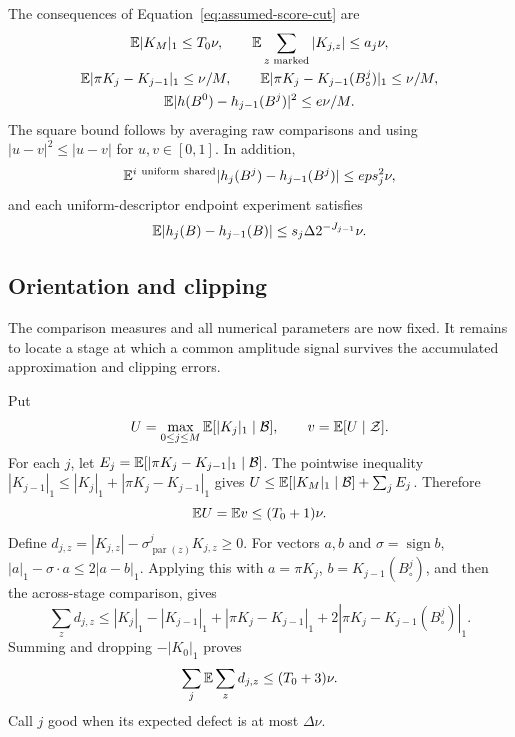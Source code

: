 The consequences of Equation~\ref{eq:assumed-score-cut} are
\begin{equation}\label{eq:funded-bounds}
 \begin{gathered}
 \mathbb E|K_M|_1\le T_0\nu,\qquad
 \mathbb E\sum_{z\text{ marked}}|K_{j,z}|\le a_j\nu,\\
 \mathbb E|\pi K_j-K_{j-1}|_1\le\nu/M,\qquad
 \mathbb E|\pi K_j-K_{j-1}(B_\circ^j)|_1\le\nu/M,\\
 \mathbb E|h(B^0)-h_{j-1}(B^j)|^2\le e\nu/M.
 \end{gathered}
\end{equation}
The square bound follows by averaging raw comparisons and using
$|u-v|^2\le|u-v|$ for $u,v\in[0,1]$. In addition,
\begin{equation}\label{eq:forced-shared-bound}
 \mathbb E^{i\ {\rm uniform\ shared}}
      |h_j(B^j)-h_{j-1}(B^j)|\le e p s_j^2\nu,
\end{equation}
and each uniform-descriptor endpoint experiment satisfies
\begin{equation}\label{eq:forced-endpoint-bound}
 \mathbb E|h_j(B)-h_{j-1}(B)|\le s_j\Delta2^{-J_{j-1}}\nu.
\end{equation}

\subsection{Orientation and clipping}

The comparison measures and all numerical parameters are now fixed. It
remains to locate a stage at which a common amplitude signal survives
the accumulated approximation and clipping errors.

Put
\[
 U=\max_{0\le j\le M}\mathbb E[|K_j|_1\mid\mathcal B],\qquad
 v=\mathbb E[U\mid\mathcal Z].
\]
For each $j$, let $E_j=\mathbb E[|\pi K_j-K_{j-1}|_1\mid\mathcal B]$.
The pointwise inequality $|K_{j-1}|_1\le|K_j|_1+
|\pi K_j-K_{j-1}|_1$ gives
$U\le\mathbb E[|K_M|_1\mid\mathcal B]+\sum_jE_j$. Therefore
\begin{equation}\label{eq:U-mean}
 \mathbb E U=\mathbb E v\le(T_0+1)\nu.
\end{equation}
Define $d_{j,z}=|K_{j,z}|-\sigma^j_{\operatorname{par}(z)}K_{j,z}\ge0$.
For vectors $a,b$ and $\sigma=\operatorname{sign}b$,
$|a|_1-\sigma\cdot a\le2|a-b|_1$. Applying this with
$a=\pi K_j$, $b=K_{j-1}(B_\circ^j)$, and then the across-stage
comparison, gives
\[
 \sum_zd_{j,z}\le |K_j|_1-|K_{j-1}|_1
       +|\pi K_j-K_{j-1}|_1
       +2|\pi K_j-K_{j-1}(B_\circ^j)|_1.
\]
Summing and dropping $-|K_0|_1$ proves
\begin{equation}\label{eq:defect-telescope}
 \sum_j\mathbb E\sum_zd_{j,z}\le(T_0+3)\nu.
\end{equation}
Call $j$ good when its expected defect is at most $\Delta\nu$.

